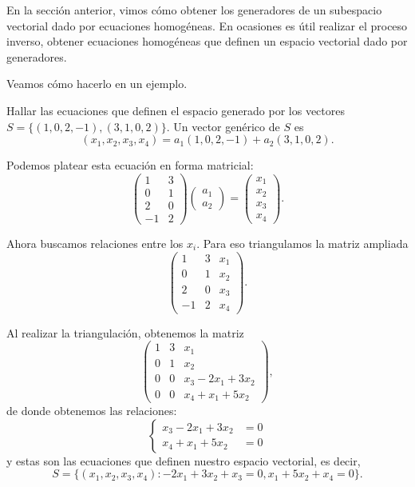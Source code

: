 En la sección anterior, vimos cómo obtener los generadores de un subespacio vectorial dado por ecuaciones homogéneas.
En ocasiones es \'util realizar el proceso inverso, obtener ecuaciones homogéneas que definen un espacio vectorial dado por generadores.

Veamos c\'omo hacerlo en un ejemplo.

\begin{ejemplo}
Hallar las ecuaciones que definen el espacio generado por los vectores $S = \{(1, 0, 2, -1), (3, 1, 0, 2)\}$.
Un vector gen\'erico de $S$ es
$$
(x_1, x_2, x_3, x_4) = a_1 (1, 0, 2, -1) + a_2 (3, 1, 0, 2).
$$

Podemos platear esta ecuaci\'on en forma matricial:
$$
\begin{pmatrix}
1 & 3 \\
0 & 1 \\
2 & 0 \\
-1 & 2
\end{pmatrix}
\begin{pmatrix}
a_1 \\
a_2
\end{pmatrix}
=
\begin{pmatrix}
x_1 \\
x_2 \\
x_3 \\
x_4
\end{pmatrix}.
$$

Ahora buscamos relaciones entre los $x_i$. Para eso triangulamos la matriz ampliada
$$
\left(
\begin{array}{cc|c}
1 & 3 & x_1 \\
0 & 1 & x_2 \\
2 & 0 & x_3 \\
-1 & 2 & x_4
\end{array}
\right).
$$

Al realizar la triangulación, obtenemos la matriz
$$
\left(
\begin{array}{cc|c}
1 & 3 & x_1 \\
0 & 1 & x_2 \\
0 & 0 & x_3 - 2 x_1 + 3x_2\\
0 & 0 & x_4 + x_1 + 5 x_2
\end{array}
\right),
$$
de donde obtenemos las relaciones:
$$
\left\{
\begin{aligned}
x_3 - 2 x_1 + 3x_2 &= 0\\
x_4 + x_1 + 5 x_2 &= 0
\end{aligned}
\right.
$$
y estas son las ecuaciones que definen nuestro espacio vectorial, es decir,
$$
S = \{(x_1, x_2, x_3, x_4): - 2 x_1 + 3x_2 + x_3 = 0, x_1 + 5 x_2 + x_4 = 0 \}.
$$
\end{ejemplo}

